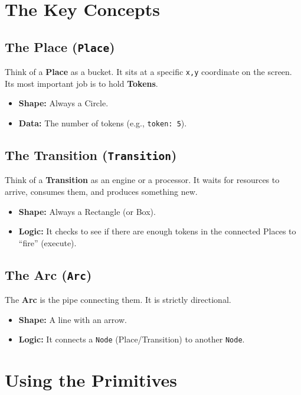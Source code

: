 \documentclass[a4paper,11pt,oneside]{report}
\begin{document}
\section{The Key Concepts}

\subsection{The Place (\texttt{Place})}

Think of a \textbf{Place} as a bucket. It sits at a specific \texttt{x,y} coordinate on the screen. Its most important job is to hold \textbf{Tokens}.
\begin{itemize}
    \item \textbf{Shape:} Always a Circle.
    \item \textbf{Data:} The number of tokens (e.g., \texttt{token: 5}).
\end{itemize}

\subsection{The Transition (\texttt{Transition})}

Think of a \textbf{Transition} as an engine or a processor. It waits for resources to arrive, consumes them, and produces something new.
\begin{itemize}
    \item \textbf{Shape:} Always a Rectangle (or Box).
    \item \textbf{Logic:} It checks to see if there are enough tokens in the connected Places to ``fire'' (execute).
\end{itemize}

\subsection{The Arc (\texttt{Arc})}

The \textbf{Arc} is the pipe connecting them. It is strictly directional.
\begin{itemize}
    \item \textbf{Shape:} A line with an arrow.
    \item \textbf{Logic:} It connects a \texttt{Node} (Place/Transition) to another \texttt{Node}.
\end{itemize}

\section{Using the Primitives}
\end{document}
